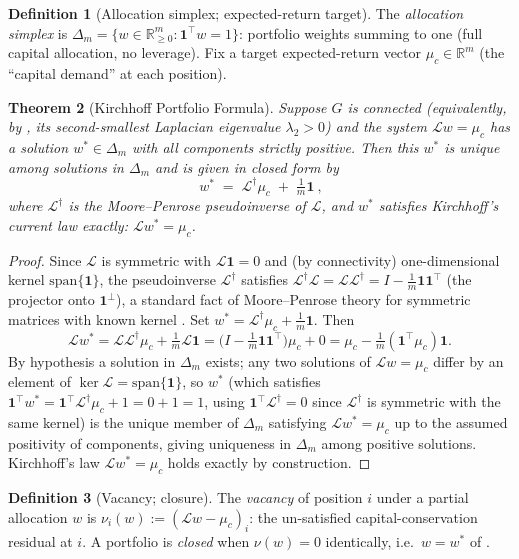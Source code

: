 \documentclass[11pt,a4paper]{article}
\theoremstyle{thmstyle}
\newtheorem{theorem}{Theorem}[section]
\theoremstyle{definition}
\newtheorem{definition}[theorem]{Definition}
\theoremstyle{remark}
\newcommand{\R}{\mathbb{R}}
\newcommand{\Lap}{\mathcal{L}}
\newcommand{\simplex}{\Delta_m}
\begin{document}
\begin{definition}[Allocation simplex; expected-return target]
\label{def:simplex}
The \emph{allocation simplex} is
$\simplex=\{w\in\R^m_{\ge0}:\mathbf{1}^\top w=1\}$: portfolio weights
summing to one (full capital allocation, no leverage). Fix a target
expected-return vector $\mu_c\in\R^m$ (the ``capital demand'' at each
position).
\end{definition}

\begin{theorem}[Kirchhoff Portfolio Formula]
\label{thm:kirchhoff}
Suppose $G$ is connected (equivalently, by
\citet{fiedler1973}, its second-smallest Laplacian eigenvalue
$\lambda_2>0$) and the system $\Lap w=\mu_c$ has a solution
$w^\ast\in\simplex$ with all components strictly positive. Then this
$w^\ast$ is unique among solutions in $\simplex$ and is given in closed
form by
\[
\boxed{\ w^\ast \;=\; \Lap^{\dagger}\mu_c \;+\; \tfrac{1}{m}\mathbf{1}\ },
\]
where $\Lap^{\dagger}$ is the Moore--Penrose pseudoinverse of $\Lap$,
and $w^\ast$ satisfies Kirchhoff's current law exactly:
$\Lap w^\ast=\mu_c$.
\end{theorem}

\begin{proof}
Since $\Lap$ is symmetric with $\Lap\mathbf{1}=0$ and (by connectivity)
one-dimensional kernel $\mathrm{span}\{\mathbf{1}\}$, the pseudoinverse
$\Lap^{\dagger}$ satisfies $\Lap^{\dagger}\Lap=\Lap\Lap^{\dagger}=I-\tfrac1m\mathbf{1}\mathbf{1}^\top$
(the projector onto $\mathbf{1}^\perp$), a standard fact of
Moore--Penrose theory for symmetric matrices with known kernel
\citep{godsilroyle2001}. Set $w^\ast=\Lap^{\dagger}\mu_c+\tfrac1m\mathbf{1}$.
Then
\[
\Lap w^\ast = \Lap\Lap^{\dagger}\mu_c + \tfrac1m\Lap\mathbf{1}
            = \bigl(I-\tfrac1m\mathbf{1}\mathbf{1}^\top\bigr)\mu_c + 0
            = \mu_c - \tfrac1m(\mathbf{1}^\top\mu_c)\mathbf{1}.
\]
By hypothesis a solution in $\simplex$ exists; any two solutions of
$\Lap w=\mu_c$ differ by an element of $\ker\Lap=\mathrm{span}\{\mathbf{1}\}$,
so $w^\ast$ (which satisfies $\mathbf{1}^\top w^\ast=\mathbf{1}^\top\Lap^{\dagger}\mu_c+1=0+1=1$,
using $\mathbf{1}^\top\Lap^{\dagger}=0$ since $\Lap^{\dagger}$ is
symmetric with the same kernel) is the unique member of $\simplex$
satisfying $\Lap w^\ast=\mu_c$ up to the assumed positivity of
components, giving uniqueness in $\simplex$ among positive solutions.
Kirchhoff's law $\Lap w^\ast=\mu_c$ holds exactly by construction.
\end{proof}

\begin{definition}[Vacancy; closure]
\label{def:vacancy}
The \emph{vacancy} of position $i$ under a partial allocation $w$ is
$\nu_i(w):=(\Lap w-\mu_c)_i$: the un-satisfied capital-conservation
residual at $i$. A portfolio is \emph{closed} when $\nu(w)=0$
identically, i.e.\ $w=w^\ast$ of .
\end{definition}
\end{document}
